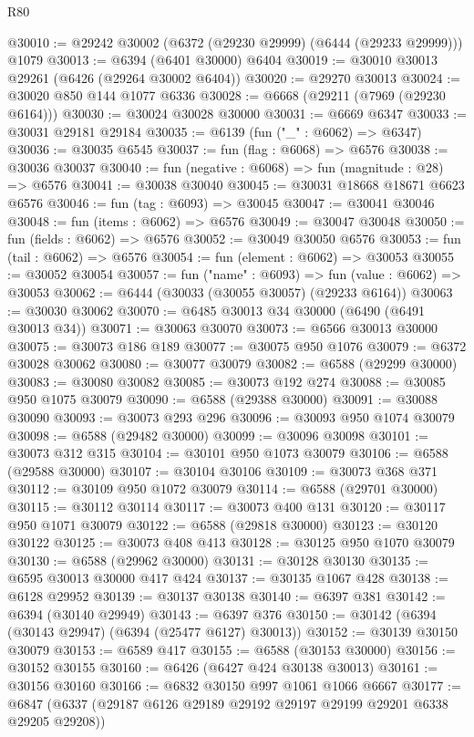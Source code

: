 \begin{lexlean}{R80}
\begin{coremodule}
@30010 := @29242 @30002 (@6372 (@29230 @29999) (@6444 (@29233 @29999))) @1079
@30013 := @6394 (@6401 @30000) @6404
@30019 := @30010 @30013 @29261 (@6426 (@29264 @30002 @6404))
@30020 := @29270 @30013
@30024 := @30020 @850 @144 @1077 @6336
@30028 := @6668 (@29211 (@7969 (@29230 @6164)))
@30030 := @30024 @30028 @30000
@30031 := @6669 @6347
@30033 := @30031 @29181 @29184
@30035 := @6139 (fun ("_" : @6062) => @6347)
@30036 := @30035 @6545
@30037 := fun (flag : @6068) => @6576
@30038 := @30036 @30037
@30040 := fun (negative : @6068) => fun (magnitude : @28) => @6576
@30041 := @30038 @30040
@30045 := @30031 @18668 @18671 @6623 @6576
@30046 := fun (tag : @6093) => @30045
@30047 := @30041 @30046
@30048 := fun (items : @6062) => @6576
@30049 := @30047 @30048
@30050 := fun (fields : @6062) => @6576
@30052 := @30049 @30050 @6576
@30053 := fun (tail : @6062) => @6576
@30054 := fun (element : @6062) => @30053
@30055 := @30052 @30054
@30057 := fun ("name" : @6093) => fun (value : @6062) => @30053
@30062 := @6444 (@30033 (@30055 @30057) (@29233 @6164))
@30063 := @30030 @30062
@30070 := @6485 @30013 @34 @30000 (@6490 (@6491 @30013 @34))
@30071 := @30063 @30070
@30073 := @6566 @30013 @30000
@30075 := @30073 @186 @189
@30077 := @30075 @950 @1076
@30079 := @6372 @30028 @30062
@30080 := @30077 @30079
@30082 := @6588 (@29299 @30000)
@30083 := @30080 @30082
@30085 := @30073 @192 @274
@30088 := @30085 @950 @1075 @30079
@30090 := @6588 (@29388 @30000)
@30091 := @30088 @30090
@30093 := @30073 @293 @296
@30096 := @30093 @950 @1074 @30079
@30098 := @6588 (@29482 @30000)
@30099 := @30096 @30098
@30101 := @30073 @312 @315
@30104 := @30101 @950 @1073 @30079
@30106 := @6588 (@29588 @30000)
@30107 := @30104 @30106
@30109 := @30073 @368 @371
@30112 := @30109 @950 @1072 @30079
@30114 := @6588 (@29701 @30000)
@30115 := @30112 @30114
@30117 := @30073 @400 @131
@30120 := @30117 @950 @1071 @30079
@30122 := @6588 (@29818 @30000)
@30123 := @30120 @30122
@30125 := @30073 @408 @413
@30128 := @30125 @950 @1070 @30079
@30130 := @6588 (@29962 @30000)
@30131 := @30128 @30130
@30135 := @6595 @30013 @30000 @417 @424
@30137 := @30135 @1067 @428
@30138 := @6128 @29952
@30139 := @30137 @30138
@30140 := @6397 @381
@30142 := @6394 (@30140 @29949)
@30143 := @6397 @376
@30150 := @30142 (@6394 (@30143 @29947) (@6394 (@25477 @6127) @30013))
@30152 := @30139 @30150 @30079
@30153 := @6589 @417
@30155 := @6588 (@30153 @30000)
@30156 := @30152 @30155
@30160 := @6426 (@6427 @424 @30138 @30013)
@30161 := @30156 @30160
@30166 := @6832 @30150 @997 @1061 @1066 @6667
@30177 := @6847 (@6337 (@29187 @6126 @29189 @29192 @29197 @29199 @29201 @6338 @29205 @29208))

\end{coremodule}
\end{lexlean}
